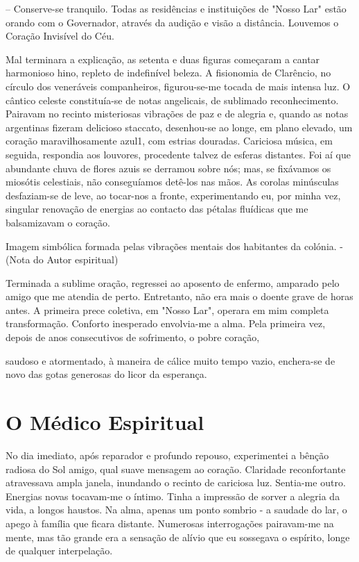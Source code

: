 \documentclass[portuguese,12pt,a4paper]{scrbook}
\begin{document}
	– Conserve-se tranquilo. Todas as residências e instituições de "Nosso Lar" estão orando com o Governador, através da audição e visão a distância. Louvemos o Coração Invisível do Céu.
	
	Mal terminara a explicação, as setenta e duas figuras começaram a cantar harmonioso hino, repleto de indefinível beleza. A fisionomia de Clarêncio, no círculo dos veneráveis companheiros, figurou-se-me tocada de mais intensa luz. O cântico celeste constituía-se de notas angelicais, de sublimado reconhecimento. Pairavam no recinto misteriosas vibrações de paz e de alegria e, quando as notas argentinas fizeram delicioso staccato, desenhou-se ao longe, em plano elevado, um coração maravilhosamente azul1, com estrias douradas. Cariciosa música, em seguida, respondia aos louvores, procedente talvez de esferas distantes. Foi aí que abundante chuva de flores azuis se derramou sobre nós; mas, se fixávamos os miosótis celestiais, não conseguíamos detê-los nas mãos. As corolas minúsculas desfaziam-se de leve, ao tocar-nos a fronte, experimentando eu, por minha vez, singular renovação de energias ao contacto das pétalas fluídicas que me balsamizavam o coração.
	
	Imagem simbólica formada pelas vibrações mentais dos habitantes da colónia. - (Nota do Autor espiritual)
	
	Terminada a sublime oração, regressei ao aposento de enfermo, amparado pelo amigo que me atendia de perto. Entretanto, não era mais o doente grave de horas antes. A primeira prece coletiva, em "Nosso Lar", operara em mim completa transformação. Conforto inesperado envolvia-me a alma. Pela primeira vez, depois de anos consecutivos de sofrimento, o pobre coração,
	
	
	saudoso e atormentado, à maneira de cálice muito tempo vazio, enchera-se de novo das gotas generosas do licor da esperança.
	
	
	\chapter{O Médico Espiritual}
	
	No dia imediato, após reparador e profundo repouso, experimentei a bênção radiosa do Sol amigo, qual suave mensagem ao coração. Claridade reconfortante atravessava ampla janela, inundando o recinto de cariciosa luz. Sentia-me outro. Energias novas tocavam-me o íntimo. Tinha a impressão de sorver a alegria da vida, a longos haustos. Na alma, apenas um ponto sombrio - a saudade do lar, o apego à família que ficara distante. Numerosas interrogações pairavam-me na mente, mas tão grande era a sensação de alívio que eu sossegava o espírito, longe de qualquer interpelação.
	
\end{document}
